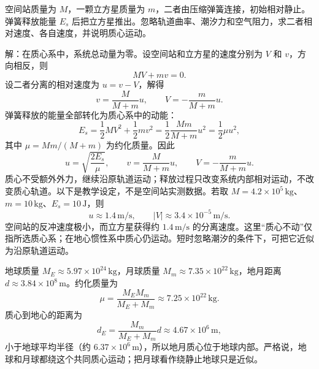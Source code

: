 \begin{example}
空间站质量为 $M$，一颗立方星质量为 $m$，二者由压缩弹簧连接，初始相对静止。弹簧释放能量 $E_s$ 后把立方星推出。忽略轨道曲率、潮汐力和空气阻力，求二者相对速度、各自速度，并说明质心运动。

\begin{center}
\end{center}

解：在质心系中，系统总动量为零。设空间站和立方星的速度分别为 $V$ 和 $v$，方向相反，则
\[
MV+mv=0.
\]
设二者分离的相对速度为 $u=v-V$，解得
\[
v=\frac{M}{M+m}u,\qquad
V=-\frac{m}{M+m}u.
\]
弹簧释放的能量全部转化为质心系中的动能：
\[
E_s=\frac12MV^2+\frac12mv^2
=\frac12\frac{Mm}{M+m}u^2
=\frac12\mu u^2,
\]
其中 $\mu=Mm/(M+m)$ 为约化质量。因此
\[
u=\sqrt{\frac{2E_s}{\mu}},\qquad
v=\frac{M}{M+m}u,\qquad
V=-\frac{m}{M+m}u.
\]
质心不受额外外力，继续沿原轨道运动；释放过程只改变系统内部相对运动，不改变质心轨道。以下是教学设定，不是空间站实测数据。若取 $M=4.2\times10^5\,\mathrm{kg}$、$m=10\,\mathrm{kg}$、$E_s=10\,\mathrm{J}$，则
\[
u\approx1.4\,\mathrm{m/s},\qquad
|V|\approx3.4\times10^{-5}\,\mathrm{m/s}.
\]
空间站的反冲速度极小，而立方星获得约 $1.4\,\mathrm{m/s}$ 的分离速度。这里“质心不动”仅指所选质心系；在地心惯性系中质心仍运动。短时忽略潮汐的条件下，可把它近似为沿原轨道运动。
\end{example}

\begin{example}[地月系统的质心]
地球质量 \(M_E\approx5.97\times10^{24}\,\mathrm{kg}\)，月球质量 \(M_m\approx7.35\times10^{22}\,\mathrm{kg}\)，地月距离 \(d\approx3.84\times10^8\,\mathrm{m}\)。约化质量为
\[
\mu=\frac{M_EM_m}{M_E+M_m}\approx7.25\times10^{22}\,\mathrm{kg}.
\]
质心到地心的距离为
\[
d_E=\frac{M_m}{M_E+M_m}d\approx4.67\times10^6\,\mathrm{m},
\]
小于地球平均半径（约 $6.37\times10^6\,\mathrm{m}$），所以地月质心位于地球内部。严格说，地球和月球都绕这个共同质心运动；把月球看作绕静止地球只是近似。
\end{example}


